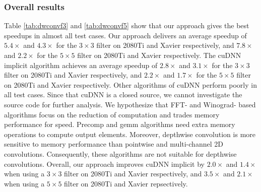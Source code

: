 \subsubsection{Overall results}
Table \ref{tab:dwconvf3} and \ref{tab:dwconvf5} show that our approach gives the best speedups in almost all test cases. 
Our approach delivers an average speedup of $5.4\times$ and $4.3\times$ for the $3 \times 3$ filter on 2080Ti and Xavier respectively, and $7.8\times$ and $2.2\times$ for the $5 \times 5$ filter on 2080Ti and Xavier respectively.
The cuDNN implicit algorithm achieves an average speedup of $2.8\times$ and $3.1\times$ for the $3 \times 3$ filter on 2080Ti and Xavier respectively, and $2.2\times$ and $1.7\times$ for the $5 \times 5$ filter on 2080Ti and Xavier respectively.
Other algorithms of cuDNN perform poorly in all test cases. 
Since that cuDNN is a closed source, we cannot investigate the source code for further analysis. 
We hypothesize that FFT- and Winograd- based algorithms focus on the reduction of computation and trades memory performance for speed. 
Precomp and gemm algorithms need extra memory operations to compute output elements. 
Moreover, depthwise convolution is more sensitive to memory performance than pointwise and multi-channel 2D convolutions. 
Consequently, these algorithms are not suitable for depthwise convolutions. 
Overall, our approach improves cuDNN implicit by $2.0\times$ and $1.4\times$ when using a $3 \times 3$  filter on 2080Ti and Xavier respectively, and $3.5\times$ and $2.1\times$ when using a $5 \times 5$ filter on 2080Ti and Xavier repsectively.

